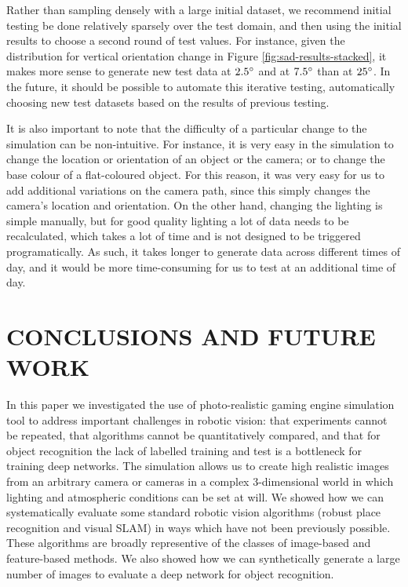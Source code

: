 \documentclass[letterpaper, 10 pt, conference]{ieeeconf}  %
\begin{document}
Rather than sampling densely with a large initial dataset, we recommend initial testing be done relatively sparsely over the test domain, and then using the initial results to choose a second round of test values. For instance, given the distribution for vertical orientation change in Figure \ref{fig:sad-results-stacked}, it makes more sense to generate new test data at $2.5\degree$ and at $7.5\degree$ than at $25\degree$. In the future, it should be possible to automate this iterative testing, automatically choosing new test datasets based on the results of previous testing.

It is also important to note that the difficulty of a particular change to the simulation can be non-intuitive. For instance, it is very easy in the simulation to change the location or orientation of an object or the camera; or to change the base colour of a flat-coloured object. For this reason, it was very easy for us to add additional variations on the camera path, since this simply changes the camera's location and orientation. On the other hand, changing the lighting is simple manually, but for good quality lighting a lot of data needs to be recalculated, which takes a lot of time and is not designed to be triggered programatically. As such, it takes longer to generate data across different times of day, and it would be more time-consuming for us to test at an additional time of day.

\section{CONCLUSIONS AND FUTURE WORK}

In this paper we investigated the use of photo-realistic gaming engine simulation tool to address important challenges in robotic vision: that
experiments cannot  be repeated, that algorithms cannot be quantitatively compared, and that for object recognition the lack of labelled training and test
is a bottleneck for training deep networks.
The simulation allows us to create high realistic images from an arbitrary camera or cameras in a complex 3-dimensional world in which lighting and atmospheric
conditions can be set at will.
We  showed how we can systematically evaluate some standard robotic vision algorithms (robust place recognition and visual SLAM) in ways which have not
been previously possible.  These algorithms are broadly representive of the classes of image-based and feature-based methods.
We also showed how we can synthetically generate a large number of images to evaluate a deep network for object recognition.
\end{document}
